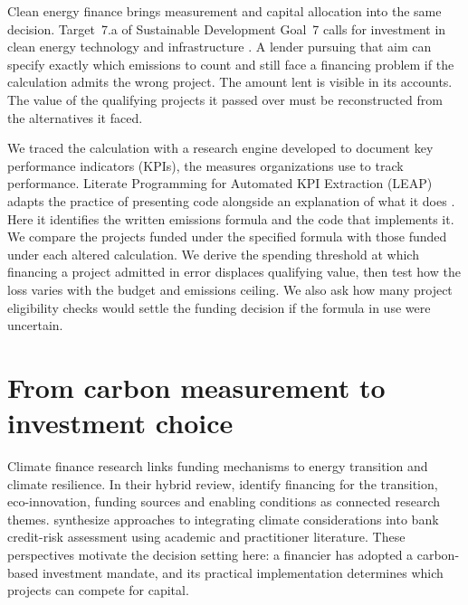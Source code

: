 Clean energy finance brings measurement and capital allocation into the same decision. Target~7.a of Sustainable Development Goal~7 calls for investment in clean energy technology and infrastructure \citep{un}. A lender pursuing that aim can specify exactly which emissions to count and still face a financing problem if the calculation admits the wrong project. The amount lent is visible in its accounts. The value of the qualifying projects it passed over must be reconstructed from the alternatives it faced.

We traced the calculation with a research engine developed to document key performance indicators (KPIs), the measures organizations use to track performance. Literate Programming for Automated KPI Extraction (LEAP) adapts the practice of presenting code alongside an explanation of what it does \citep{knuth,zenodo,leap}. Here it identifies the written emissions formula and the code that implements it. We compare the projects funded under the specified formula with those funded under each altered calculation. We derive the spending threshold at which financing a project admitted in error displaces qualifying value, then test how the loss varies with the budget and emissions ceiling. We also ask how many project eligibility checks would settle the funding decision if the formula in use were uncertain.

\section{From carbon measurement to investment choice}
Climate finance research links funding mechanisms to energy transition and climate resilience. In their hybrid review, \citet{joshipura2025} identify financing for the transition, eco-innovation, funding sources and enabling conditions as connected research themes. \citet{raimondi2026} synthesize approaches to integrating climate considerations into bank credit-risk assessment using academic and practitioner literature. These perspectives motivate the decision setting here: a financier has adopted a carbon-based investment mandate, and its practical implementation determines which projects can compete for capital.

